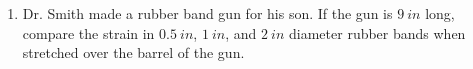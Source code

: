\documentclass[12pt, oneside]{article}
\let\US\SI
\begin{document}
\begin{enumerate}
	\item %
		Dr. Smith made a rubber band gun for his son.
		If the gun is $\US{9}{in}$ long, compare the strain in $\US{0.5}{in}$,  $\US{1}{in}$, and $\US{2}{in}$ diameter rubber bands when stretched over the barrel of the gun.  


\end{enumerate}
\end{document}

